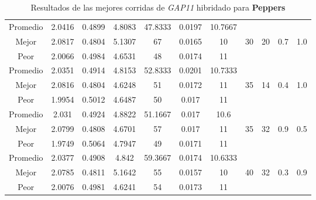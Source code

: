 \begin{table}[h!]
\begin{center}
\begin{tabular}{|c|c|c|c|c|c|c|c|c|c|c|}
        \hline
        \hline
            Promedio  & 2.0416 & 0.4899 & 4.8083 & 47.8333 & 0.0197 & 10.7667 &  &  &  & \\
            \cline{1-7}
            Mejor & 2.0817 & 0.4804  & 5.1307 & 67 & 0.0165 & 10 & 30 & 20 & 0.7 & 1.0\\
            \cline{1-7}
            Peor & 2.0066 & 0.4984  & 4.6531 & 48 & 0.0174 & 11 &  &  &  & \\
        \hline
        \hline
            Promedio  & 2.0351 & 0.4914 & 4.8153 & 52.8333 & 0.0201 & 10.7333 &  &  &  & \\
            \cline{1-7}
            Mejor & 2.0816 & 0.4804  & 4.6248 & 51 & 0.0172 & 11 & 35 & 14 & 0.4 & 1.0\\
            \cline{1-7}
            Peor & 1.9954 & 0.5012  & 4.6487 & 50 & 0.017 & 11 &  &  &  & \\
        \hline
        \hline
            Promedio  & 2.031 & 0.4924 & 4.8822 & 51.1667 & 0.017 & 10.6 &  &  &  & \\
            \cline{1-7}
            Mejor & 2.0799 & 0.4808  & 4.6701 & 57 & 0.017 & 11 & 35 & 32 & 0.9 & 0.5\\
            \cline{1-7}
            Peor & 1.9749 & 0.5064  & 4.7947 & 49 & 0.0171 & 11 &  &  &  & \\
        \hline
        \hline
            Promedio  & 2.0377 & 0.4908 & 4.842 & 59.3667 & 0.0174 & 10.6333 &  &  &  & \\
            \cline{1-7}
            Mejor & 2.0785 & 0.4811  & 5.1642 & 55 & 0.0157 & 10 & 40 & 32 & 0.3 & 0.9\\
            \cline{1-7}
            Peor & 2.0076 & 0.4981  & 4.6241 & 54 & 0.0173 & 11 &  &  &  & \\
        \hline
        \end{tabular}
        \caption{Resultados de las mejores corridas de \emph{GAP11} hibridado para {\bf Peppers}}
        \label{tb:tableGAP11}
    \end{center}
\end{table}
